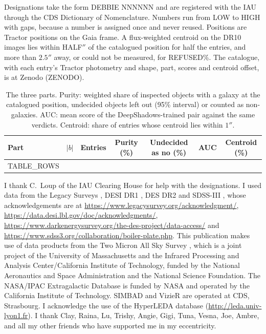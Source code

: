 \documentclass{aastex701}
\begin{document}
Designations take the form DEBBIE NNNNNN and are registered with the IAU
through the CDS Dictionary of Nomenclature. Numbers run from {{LOW}} to {{HIGH}}
with gaps, because a number is assigned once and never reused. Positions are
Tractor positions on the Gaia frame. A flux-weighted centroid on the DR10 images
lies within {{HALF}}$''$ of the catalogued position for half the entries, and
more than $2.5''$ away, or could not be measured, for {{REFUSED}}\%. The
catalogue, with each entry's Tractor photometry and shape, part, scores and
centroid offset, is at Zenodo ({{ZENODO}}).

\begin{table}[h]
\centering
\caption{The three parts. Purity: weighted share of inspected objects with a
galaxy at the catalogued position, undecided objects left out (95\% interval)
or counted as non-galaxies. AUC: mean score of the DeepShadows-trained pair
against the same verdicts. Centroid: share of entries whose centroid lies
within $1''$.\label{tab:parts}}
\begin{tabular}{lcrcccc}
\hline
Part & $|b|$ & Entries & Purity (\%) & Undecided as no (\%) & AUC & Centroid (\%) \\
\hline
{{TABLE_ROWS}}
\hline
\end{tabular}
\end{table}

\begin{acknowledgments}
I thank C.~Loup of the IAU Clearing House for help with the designations. I used
data from the Legacy Surveys \citep{dey2019}, DESI DR1 \citep{desidr1}, DES DR2
\citep{abbott2021des} and SDSS-III \citep{alam2015}, whose acknowledgements are
at \url{https://www.legacysurvey.org/acknowledgment/},
\url{https://data.desi.lbl.gov/doc/acknowledgments/},
\url{https://www.darkenergysurvey.org/the-des-project/data-access/} and
\url{https://www.sdss3.org/collaboration/boiler-plate.php}. This publication
makes use of data products from the Two Micron All Sky Survey \citep{skrutskie2006},
which is a joint project of the University of Massachusetts and the Infrared
Processing and Analysis Center/California Institute of Technology, funded by the
National Aeronautics and Space Administration and the National Science
Foundation. The NASA/IPAC Extragalactic Database is funded by NASA and operated
by the California Institute of Technology. SIMBAD and VizieR are operated at
CDS, Strasbourg. I acknowledge the use of the HyperLEDA database
(\url{http://leda.univ-lyon1.fr}). I thank Clay, Raina, Lu, Trishy, Angie, Gigi, Tuna, Vesna, Joe, Ambre, and all my
other friends who have supported me in my eccentricity.
\end{acknowledgments}
\end{document}
